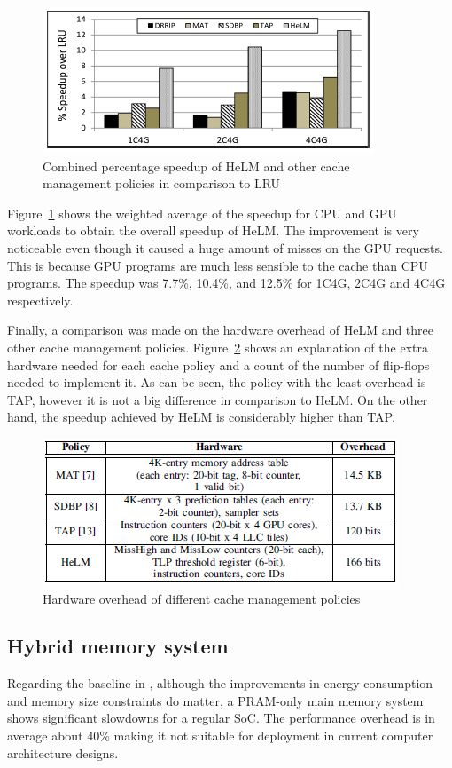 \documentclass[journal]{IEEEtran}
\begin{document}
\begin{figure}[h]
	\centering
	\includegraphics[width = 8 cm]{graphics/LLCresults2.png}
	\caption{Combined percentage speedup of HeLM and other cache management policies in comparison to LRU \cite{LLC}}\label{fig:comp1}
\end{figure} 

Figure~\ref{fig:comp1} shows the weighted average of the speedup for CPU and GPU workloads to obtain the overall speedup of HeLM. The improvement is very noticeable even though it caused a huge amount of misses on the GPU requests. This is because GPU programs are much less sensible to the cache than CPU programs. The speedup was 7.7\%, 10.4\%, and 12.5\% for 1C4G, 2C4G and 4C4G respectively. \cite{LLC}



Finally, a comparison was made on the hardware overhead of HeLM and three other cache management policies. Figure~\ref{fig:LLChw} shows an explanation of the extra hardware needed for each cache policy and a count of the number of flip-flops needed to implement it. As can be seen, the policy with the least overhead is TAP, however it is not a big difference in comparison to HeLM. On the other hand, the speedup achieved by HeLM is considerably higher than TAP.

\begin{figure}[H]
	\centering
	\includegraphics[width = 8 cm]{graphics/LLChardware.png}
	\caption{Hardware overhead of different cache management policies \cite{LLC}}\label{fig:LLChw}
\end{figure}

\subsection{Hybrid memory system}
Regarding the baseline in \cite{PDRAM}, although the improvements in energy consumption and memory size constraints do matter, a PRAM-only main memory system shows significant slowdowns for a regular SoC. The performance overhead is in average about 40\% making it not suitable for deployment in current computer architecture designs. 
\end{document}

